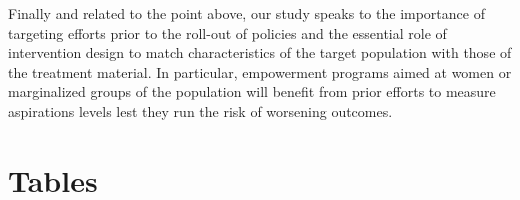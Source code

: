 \documentclass[11.5pt]{article}
\begin{document}
Finally and related to the point above, our study speaks to the importance of targeting efforts prior to the roll-out of policies and the essential role of intervention design to match characteristics of the target population with those of the treatment material. In particular, empowerment programs aimed at women or marginalized groups of the population will benefit from prior efforts to measure aspirations levels lest they run the risk of worsening outcomes.


\pagebreak




\clearpage




\onehalfspacing
\section*{Tables} \label{sec:tab}
\end{document}

